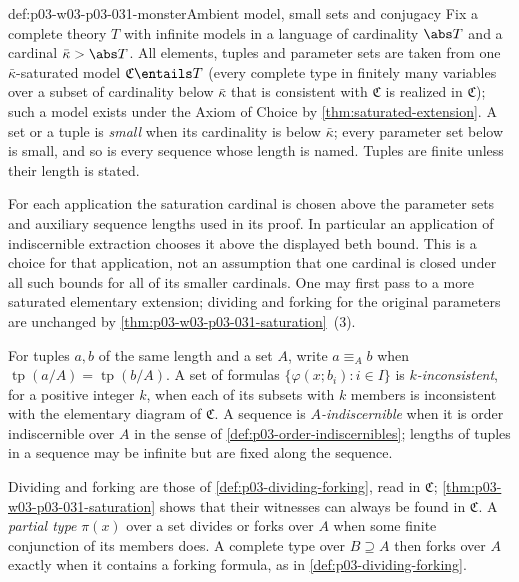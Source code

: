 \begin{hbconvention}{def:p03-w03-p03-031-monster}{Ambient model, small sets and conjugacy}
Fix a complete theory \(T\) with infinite models in a language of
cardinality \(\abs T\) and a cardinal \(\bar\kappa>\abs T\).  All
elements, tuples and parameter sets are taken from one
\(\bar\kappa\)-saturated model \(\mathfrak C\entails T\)
(every complete type in finitely many variables over a subset of
cardinality below \(\bar\kappa\) that is consistent with \(\mathfrak C\) is
realized in \(\mathfrak C\)); such a model exists under the Axiom of Choice
by \cref{thm:saturated-extension}.  A set or a tuple is \emph{small}
when its cardinality is below \(\bar\kappa\); every parameter set below is
small, and so is every sequence whose length is named.  Tuples are finite
unless their length is stated.

For each application the saturation cardinal is chosen above the parameter
sets and auxiliary sequence lengths used in its proof.  In particular an
application of indiscernible extraction chooses it above the displayed beth
bound.  This is a choice for that application, not an assumption that one
cardinal is closed under all such bounds for all of its smaller cardinals.
One may first pass to a more saturated elementary extension; dividing and
forking for the original parameters are unchanged by
\cref{thm:p03-w03-p03-031-saturation}~(3).

For tuples \(a,b\) of the same length and a set \(A\), write
\(a\equiv_A b\) when \(\operatorname{tp}(a/A)=\operatorname{tp}(b/A)\).
A set of formulas \(\{\varphi(x;b_i):i\in I\}\) is
\emph{\(k\)-inconsistent}, for a positive integer \(k\), when each of its
subsets with \(k\) members is inconsistent with the elementary diagram of
\(\mathfrak C\).  A sequence is \emph{\(A\)-indiscernible} when it is order
indiscernible over \(A\) in the sense of
\cref{def:p03-order-indiscernibles}; lengths of tuples in a sequence may
be infinite but are fixed along the sequence.

Dividing and forking are those of \cref{def:p03-dividing-forking}, read in
\(\mathfrak C\); \cref{thm:p03-w03-p03-031-saturation} shows that their
witnesses can always be found in \(\mathfrak C\).  A \emph{partial type}
\(\pi(x)\) over a set divides or forks over \(A\) when some finite
conjunction of its members does.  A complete type over \(B\supseteq A\)
then forks over \(A\) exactly when it contains a forking formula, as in
\cref{def:p03-dividing-forking}.
\end{hbconvention}

